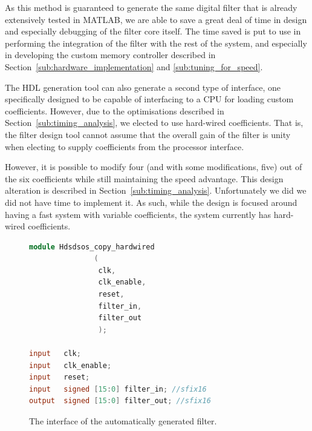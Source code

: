 \documentclass[]{article}
\begin{document}
As this method is guaranteed to generate the same digital filter that is already extensively tested in MATLAB, we are able to save a great deal of time in design and especially debugging of the filter core itself.
The time saved is put to use in performing the integration of the filter with the rest of the system, and especially in developing the custom memory controller described in Section~\ref{sub:hardware_implementation} and \ref{sub:tuning_for_speed}.

The HDL generation tool can also generate a second type of interface, one specifically designed to be capable of interfacing to a CPU for loading custom coefficients. However, due to the optimisations described in Section~\ref{sub:timing_analysis}, we elected to use hard-wired coefficients.
That is, the filter design tool cannot assume that the overall gain of the filter is unity when electing to supply coefficients from the processor interface.

However, it is possible to modify four (and with some modifications, five) out of the six coefficients while still maintaining the speed advantage. This design alteration is described in Section~\ref{sub:timing_analysis}. Unfortunately we did we did not have time to implement it.
As such, while the design is focused around having a fast system with variable coefficients, the system currently has hard-wired coefficients.

\begin{figure}[tbp]
	\begin{center}
		\begin{lstlisting}[language = Verilog]
module Hdsdsos_copy_hardwired
               (
                clk,
                clk_enable,
                reset,
                filter_in,
                filter_out
                );

input   clk; 
input   clk_enable; 
input   reset; 
input   signed [15:0] filter_in; //sfix16
output  signed [15:0] filter_out; //sfix16
		\end{lstlisting}
	\end{center}
	\caption{The interface of the automatically generated filter.}
	\label{fig:Hdsdsos_interface}
\end{figure}

\end{document}
